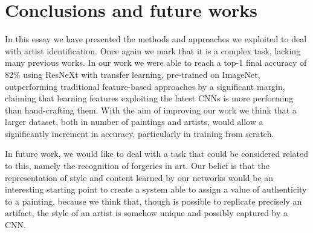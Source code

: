 \documentclass{article}
\begin{document}
\section{Conclusions and future works}\label{conclusions}
In this essay we have presented the methods and approaches we exploited to deal with artist identification. Once again we mark that it is a complex task, lacking many previous works. 
In our work we were able to reach a top-1 final accuracy of 82\% using ResNeXt with transfer learning, pre-trained on ImageNet, outperforming traditional feature-based approaches by a significant margin, claiming that learning features exploiting the latest CNNs is more performing than hand-crafting them. With the aim of improving our work we think that a larger dataset, both in number of paintings and artists, would allow a significantly increment in accuracy, particularly in training from scratch. 

In future work, we would like to deal with a task that could be considered related to this, namely the recognition of forgeries in art. Our belief is that the representation of style and content learned by our networks would be an interesting starting point to create a system able to assign a value of authenticity to a painting, because we think that, though is possible to replicate precisely an artifact, the style of an artist is somehow unique and possibly captured by a CNN.
\end{document}
